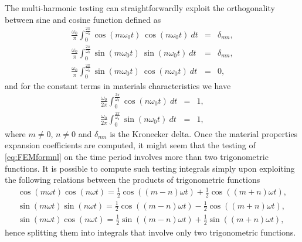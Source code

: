 The multi-harmonic testing can straightforwardly exploit the orthogonality between sine and cosine function defined as
%
\begin{eqnarray*}
\frac{\omega_0}{\pi}\int_{0}^{\frac{2\pi}{\omega_0}} \cos(m \omega_0 t) \ \cos(n \omega_0 t) \ dt &= &\delta_{mn},\\
\frac{\omega_0}{\pi}\int_{0}^{\frac{2\pi}{\omega_0}} \sin(m \omega_0 t) \ \sin(n \omega_0 t) \ dt &= &\delta_{mn},\\
\frac{\omega_0}{\pi}\int_{0}^{\frac{2\pi}{\omega_0}} \sin(m \omega_0 t) \ \cos(n \omega_0 t) \ dt &= &0,
\end{eqnarray*}
%
\noindent and for the constant terms in materials characteristics we have
\begin{eqnarray*}
\frac{\omega_0}{2\pi}\int_{0}^{\frac{2\pi}{\omega_0}} \cos(n \omega_0 t) \ dt &= & 1,\\
\frac{\omega_0}{2\pi}\int_{0}^{\frac{2\pi}{\omega_0}} \sin(n \omega_0 t) \ dt &= & 1,
\end{eqnarray*}
%
\noindent where $m \neq 0$, $n \neq 0$ and $\delta_{mn}$ is the Kronecker delta. Once the material properties expansion coefficients are computed, it might seem that the testing of \eqref{eq:FEMformnl} on the time period involves more than two trigonometric functions. It is possible to compute such testing integrals simply upon exploiting the following relations between the products of trigonometric functions
\begin{gather}
\cos (m \omega t) \cos(n \omega t) = \frac{1}{2} \cos ((m-n) \omega t ) + \frac{1}{2}  \cos((m+n) \omega t), \\
\sin (m \omega t) \sin(n \omega t) = \frac{1}{2} \cos ((m-n) \omega t ) - \frac{1}{2}  \cos((m+n) \omega t), \\
\sin (m \omega t) \cos(n \omega t) = \frac{1}{2} \sin ((m-n) \omega t ) + \frac{1}{2}  \sin((m+n) \omega t),
\end{gather}
\noindent hence splitting them into integrals that involve only two trigonometric functions.

